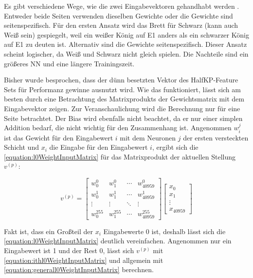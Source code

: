 Es gibt verschiedene Wege, wie die zwei Eingabevektoren gehandhabt werden \cite{StockfishNNUE}. Entweder beide Seiten verwenden dieselben Gewichte oder die Gewichte sind seitenspezifisch. Für den ersten Ansatz wird das Brett für Schwarz (kann auch Weiß sein) gespiegelt, weil ein weißer König auf E1 anders als ein schwarzer König auf E1 zu deuten ist. Alternativ sind die Gewichte seitenspezifisch. Dieser Ansatz scheint logischer, da Weiß und Schwarz nicht gleich spielen. Die Nachteile sind ein größeres \ac{NN} und eine längere Trainingszeit.

Bisher wurde besprochen, dass der dünn besetzten Vektor des HalfKP-Feature Sets für Performanz gewinne ausnutzt wird. Wie das funktioniert, lässt sich am besten durch eine Betrachtung des Matrixprodukts der Gewichtsmatrix mit dem Eingabevektor zeigen. Zur Veranschaulichung wird die Berechnung nur für eine Seite betrachtet. Der Bias wird ebenfalls nicht beachtet, da er nur einer simplen Addition bedarf, die nicht wichtig für den Zusammenhang ist. Angenommen $w_{i}^{j}$ ist das Gewicht für den Eingabewert $i$ mit dem Neuronen $j$ der ersten versteckten Schicht und $x_{i}$ die Eingabe für den Eingabewert $i$, ergibt sich die \autoref{equation:l0WeightInputMatrix} für das Matrixprodukt der aktuellen Stellung $v^{(p)}$:

\begin{equation}
  v^{(p)} = \begin{bmatrix}
    w_{0}^{0}   & w_{1}^{0}   & \cdots & w_{40959}^{0}   \\
    w_{0}^{1}   & w_{1}^{1}   & \cdots & w_{40959}^{1}   \\
    \vdots      & \vdots      & \ddots & \vdots          \\
    w_{0}^{255} & w_{1}^{255} & \cdots & w_{40959}^{255}
  \end{bmatrix} \begin{bmatrix}
    x_{0}  \\
    x_{1}  \\
    \vdots \\
    x_{40959}
  \end{bmatrix}
  \label{equation:l0WeightInputMatrix}
\end{equation}

Fakt ist, dass ein Großteil der $x_{i}$ Eingabewerte 0 ist, deshalb lässt sich die \autoref{equation:l0WeightInputMatrix} deutlich vereinfachen. Angenommen nur ein Eingabewert ist 1 und der Rest 0, lässt sich $v^{(p)}$ mit \autoref{equation:ithl0WeightInputMatrix} und allgemein mit \autoref{equation:generall0WeightInputMatrix} berechnen.

